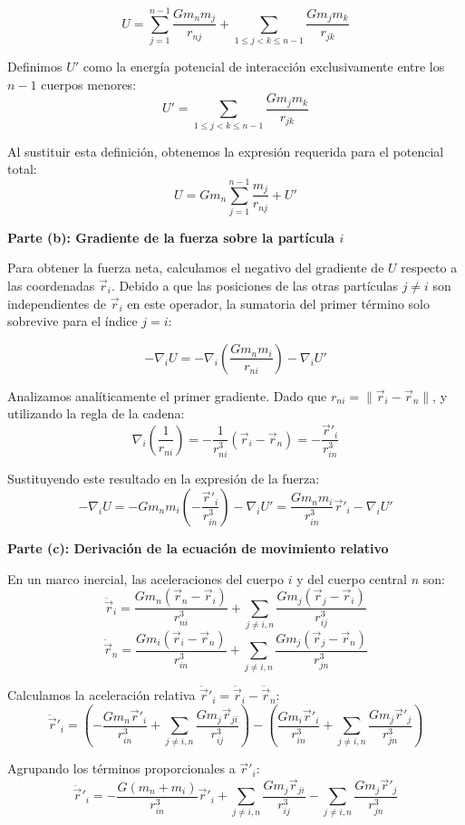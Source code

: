 \documentclass[12pt, letterpaper]{article}
\begin{document}
$$ U = \sum_{j=1}^{n-1} \frac{G m_n m_j}{r_{nj}} + \sum_{1 \leq j < k \leq n-1} \frac{G m_j m_k}{r_{jk}} $$

Definimos $U'$ como la energía potencial de interacción exclusivamente entre los $n-1$ cuerpos menores:
$$ U' = \sum_{1 \leq j < k \leq n-1} \frac{G m_j m_k}{r_{jk}} $$

Al sustituir esta definición, obtenemos la expresión requerida para el potencial total:
$$ U = G m_n \sum_{j=1}^{n-1} \frac{m_j}{r_{nj}} + U' $$

\textbf{Parte (b): Gradiente de la fuerza sobre la partícula $i$}

Para obtener la fuerza neta, calculamos el negativo del gradiente de $U$ respecto a las coordenadas $\vec{r}_i$. Debido a que las posiciones de las otras partículas $j \neq i$ son independientes de $\vec{r}_i$ en este operador, la sumatoria del primer término solo sobrevive para el índice $j = i$:

$$ -\nabla_i U = -\nabla_i \left( \frac{G m_n m_i}{r_{ni}} \right) - \nabla_i U' $$

Analizamos analíticamente el primer gradiente. Dado que $r_{ni} = \|\vec{r}_i - \vec{r}_n\|$, y utilizando la regla de la cadena:
$$ \nabla_i \left( \frac{1}{r_{ni}} \right) = -\frac{1}{r_{ni}^3} (\vec{r}_i - \vec{r}_n) = -\frac{\vec{r}'_i}{r_{in}^3} $$

Sustituyendo este resultado en la expresión de la fuerza:
$$ -\nabla_i U = -G m_n m_i \left( -\frac{\vec{r}'_i}{r_{in}^3} \right) - \nabla_i U' = \frac{G m_n m_i}{r_{in}^3} \vec{r}'_i - \nabla_i U' $$

\textbf{Parte (c): Derivación de la ecuación de movimiento relativo}

En un marco inercial, las aceleraciones del cuerpo $i$ y del cuerpo central $n$ son:
$$ \ddot{\vec{r}}_i = \frac{G m_n (\vec{r}_n - \vec{r}_i)}{r_{ni}^3} + \sum_{j \neq i, n} \frac{G m_j (\vec{r}_j - \vec{r}_i)}{r_{ij}^3} $$
$$ \ddot{\vec{r}}_n = \frac{G m_i (\vec{r}_i - \vec{r}_n)}{r_{in}^3} + \sum_{j \neq i, n} \frac{G m_j (\vec{r}_j - \vec{r}_n)}{r_{jn}^3} $$

Calculamos la aceleración relativa $\ddot{\vec{r}}'_i = \ddot{\vec{r}}_i - \ddot{\vec{r}}_n$:
$$ \ddot{\vec{r}}'_i = \left( -\frac{G m_n \vec{r}'_i}{r_{in}^3} + \sum_{j \neq i, n} \frac{G m_j \vec{r}_{ji}}{r_{ij}^3} \right) - \left( \frac{G m_i \vec{r}'_i}{r_{in}^3} + \sum_{j \neq i, n} \frac{G m_j \vec{r}'_j}{r_{jn}^3} \right) $$

Agrupando los términos proporcionales a $\vec{r}'_i$:
$$ \ddot{\vec{r}}'_i = -\frac{G(m_n + m_i)}{r_{in}^3} \vec{r}'_i + \sum_{j \neq i, n} \frac{G m_j \vec{r}_{ji}}{r_{ij}^3} - \sum_{j \neq i, n} \frac{G m_j \vec{r}'_j}{r_{jn}^3} $$
\end{document}
